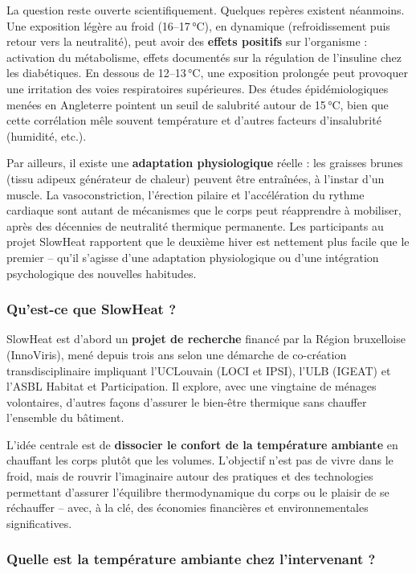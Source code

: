 La question reste ouverte scientifiquement. Quelques repères existent néanmoins. Une exposition légère au froid (16--17\,°C), en dynamique (refroidissement puis retour vers la neutralité), peut avoir des \textbf{effets positifs} sur l'organisme : activation du métabolisme, effets documentés sur la régulation de l'insuline chez les diabétiques. En dessous de 12--13\,°C, une exposition prolongée peut provoquer une irritation des voies respiratoires supérieures. Des études épidémiologiques menées en Angleterre pointent un seuil de salubrité autour de 15\,°C, bien que cette corrélation mêle souvent température et d'autres facteurs d'insalubrité (humidité, etc.).

Par ailleurs, il existe une \textbf{adaptation physiologique} réelle : les graisses brunes (tissu adipeux générateur de chaleur) peuvent être entraînées, à l'instar d'un muscle. La vasoconstriction, l'érection pilaire et l'accélération du rythme cardiaque sont autant de mécanismes que le corps peut réapprendre à mobiliser, après des décennies de neutralité thermique permanente. Les participants au projet SlowHeat rapportent que le deuxième hiver est nettement plus facile que le premier -- qu'il s'agisse d'une adaptation physiologique ou d'une intégration psychologique des nouvelles habitudes.

\subsubsection{Qu'est-ce que SlowHeat ?}

SlowHeat est d'abord un \textbf{projet de recherche} financé par la Région bruxelloise (InnoViris), mené depuis trois ans selon une démarche de co-création transdisciplinaire impliquant l'UCLouvain (LOCI et IPSI), l'ULB (IGEAT) et l'ASBL Habitat et Participation. Il explore, avec une vingtaine de ménages volontaires, d'autres façons d'assurer le bien-être thermique sans chauffer l'ensemble du bâtiment.

L'idée centrale est de \textbf{dissocier le confort de la température ambiante} en chauffant les corps plutôt que les volumes. L'objectif n'est pas de vivre dans le froid, mais de rouvrir l'imaginaire autour des pratiques et des technologies permettant d'assurer l'équilibre thermodynamique du corps ou le plaisir de se réchauffer -- avec, à la clé, des économies financières et environnementales significatives.

\subsubsection{Quelle est la température ambiante chez l'intervenant ?}

